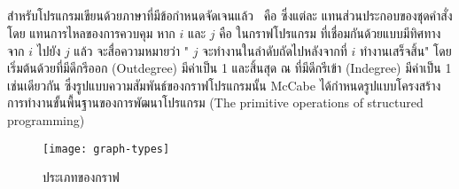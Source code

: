 \subsection{\FirstTimeDefine{\ProgramGraph}{\ProgramGraphEN}} 

สำหรับโปรแกรมเขียนด้วยภาษาที่มีข้อกำหนดจัดเจนแล้ว {\ProgramGraph}\ คือ \FirstTimeDefine{\DirectedGraph}{\DirectedGraphEN} 
ซึ่งแต่ละ {\FirstTimeDefine{\Node}{\NodeEN}} แทนส่วนประกอบของชุดคำสั่ง โดย{\FirstTimeDefine{\Edge}{\EdgeEN}} แทนการไหลของการควบคุม 
หาก $i$ และ $j$ คือ {\Node}ในกราฟโปรแกรม ที่เชื่อมกันด้วย{\Edge}แบบมีทิศทางจาก $i$ ไปยัง $j$ แล้ว จะสื่อความหมายว่า 
"{\Node} $j$ จะทำงานในลำดับถัดไปหลังจากที่ $i$ ทำงานเสร็จสิ้น" \cite{Jorgensen2013} โดยเริ่มต้นด้วย{\Node}ที่มีดีกรีออก 
(Outdegree) มีค่าเป็น 1 และสิ้นสุด ณ \Node ที่มีดีกรีเข้า (Indegree) มีค่าเป็น 1 เช่นเดียวกัน ซึ่งรูปแบบความสัมพันธ์ของกราฟโปรแกรมนั้น 
McCabe \cite{Watson1996} ได้กำหนดรูปแบบโครงสร้างการทำงานขั้นพื้นฐานของการพัฒนาโปรแกรม 
(The primitive operations of structured programming) 

\begin{figure}[ht!]
    \centering
    \texttt{[image: graph-types]}
    \caption{ประเภทของกราฟ}
    \label{fig:graphtype}
\end{figure}

